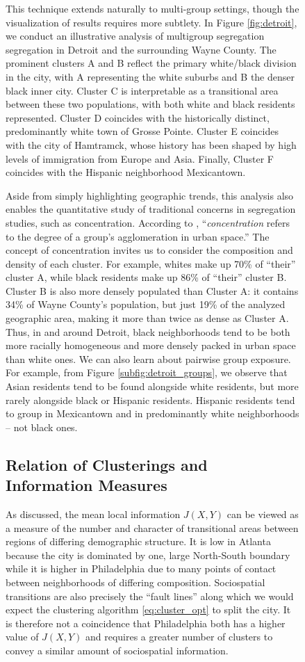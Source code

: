 \documentclass[english]{scrartcl}
\begin{document}
\begin{figure}
		This technique extends naturally to multi-group settings, though the visualization of results requires more subtlety. In Figure \ref{fig:detroit}, we conduct an illustrative analysis of multigroup segregation segregation in Detroit and the surrounding Wayne County. The prominent clusters A and B reflect the primary white/black division in the city, with A representing the white suburbs and B the denser black inner city. Cluster C is interpretable as a transitional area between these two populations, with both white and black residents represented. Cluster D coincides with the historically distinct, predominantly white town of Grosse Pointe. Cluster E coincides with the city of Hamtramck, whose history has been shaped by high levels of immigration from Europe and Asia. Finally, Cluster F coincides with the Hispanic neighborhood Mexicantown. 

		Aside from simply highlighting geographic trends, this analysis also enables the quantitative study of traditional concerns in segregation studies, such as concentration. According to \cite{Massey1988}, ``\emph{concentration} refers to the degree of a group's agglomeration in urban space.'' The concept of concentration invites us to consider the composition and density of each cluster. For example, whites make up 70\% of ``their'' cluster A, while black residents make up 86\% of ``their'' cluster B. Cluster B is also more densely populated than Cluster A: it contains 34\% of Wayne County's population, but just 19\% of the analyzed geographic area, making it more than twice as dense as Cluster A. Thus, in and around Detroit, black neighborhoods tend to be both more racially homogeneous and more densely packed in urban space than white ones. We can also learn about pairwise group exposure. For example, from Figure  \ref{subfig:detroit_groups}, we observe that Asian residents tend to be found alongside white residents, but more rarely alongside black or Hispanic residents. Hispanic residents tend to group in Mexicantown and in predominantly white neighborhoods -- not black ones.

	\subsection{Relation of Clusterings and Information Measures}

		As discussed, the mean local information $J(X,Y)$ can be viewed as a measure of the number and character of transitional areas between regions of differing demographic structure.  It is low in Atlanta because the city is dominated by one, large North-South boundary while it is higher in Philadelphia due to many points of contact between neighborhoods of differing composition. Sociospatial transitions are also precisely the ``fault lines'' along which we would expect the clustering algorithm \eqref{eq:cluster_opt} to split the city. It is therefore not a coincidence that Philadelphia both has a higher value of $J(X,Y)$ and requires a greater number of clusters to convey a similar amount of sociospatial information. 


\end{figure}
\end{document}
